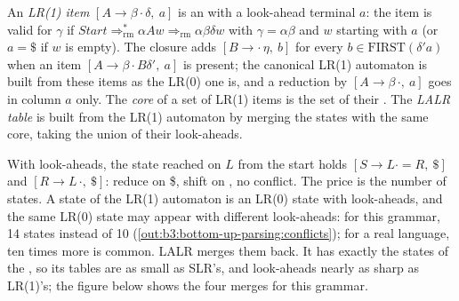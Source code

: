 \begin{definition}\label{def:b3:bottom-up-parsing:lr1}
An \emph{LR(1) item} $[A \to \beta \cdot \delta,\ a]$ is an  with a look-ahead terminal $a$: the item is valid for $\gamma$ if $\mathit{Start} \Rightarrow^*_{\mathrm{rm}} \alpha A w \Rightarrow_{\mathrm{rm}} \alpha\beta\delta w$ with $\gamma = \alpha\beta$ and $w$ starting with $a$ (or $a = \$$ if $w$ is empty). The closure adds $[B \to \cdot\,\eta,\ b]$ for every $b \in \mathrm{FIRST}(\delta' a)$ when an item $[A \to \beta \cdot B\delta',\ a]$ is present; the canonical LR(1) automaton is built from these items as the LR(0) one is, and a reduction by $[A \to \beta\,\cdot,\ a]$ goes in column $a$ only. The \emph{core} of a set of LR(1) items is the set of their . The \emph{LALR table} is built from the LR(1) automaton by merging the states with the same core, taking the union of their look-aheads.
\end{definition}

\label{lst:b3:bottom-up-parsing:closure1}

With look-aheads, the state reached on $L$ from the start holds $[S \to L \cdot = R,\ \$]$ and $[R \to L\,\cdot,\ \$]$: reduce on \$, shift on \code{=}, no conflict. The price is the number of states. A state of the LR(1) automaton is an LR(0) state with look-aheads, and the same LR(0) state may appear with different look-aheads: for this grammar, 14 states instead of 10 (\cref{out:b3:bottom-up-parsing:conflicts}); for a real language, ten times more is common. LALR merges them back. It has exactly the states of the , so its tables are as small as SLR's, and look-aheads nearly as sharp as LR(1)'s; the figure below shows the four merges for this grammar.

\label{lst:b3:bottom-up-parsing:lalr}

\label{out:b3:bottom-up-parsing:conflicts}


